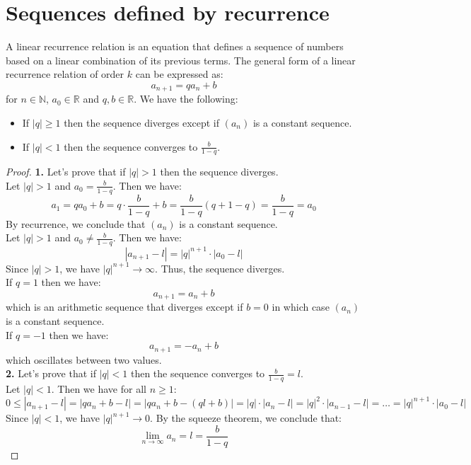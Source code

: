 \section{Sequences defined by recurrence}
\begin{definition}
    A linear recurrence relation is an equation that defines a sequence of numbers based on a linear combination of its previous terms. The general form of a linear recurrence relation of order \( k \) can be expressed as:
    \[
        a_{n + 1} = q a_n + b
    \]
    for \( n \in \mathbb{N} \), \( a_0 \in \mathbb{R} \) and \( q, b \in \mathbb{R} \). We have the following:
    \begin{itemize}[itemsep=1pt,label=$\circ$]
        \item If $|q| \geq 1$ then the sequence diverges except if $(a_n)$ is a constant sequence.
        \item If $|q| < 1$ then the sequence converges to $\frac{b}{1 - q}$.
    \end{itemize}
\end{definition}
\begin{proof}
    \textbf{1.} Let's prove that if $|q| > 1$ then the sequence diverges. \\
    Let $|q| > 1$ and $a_0 = \frac{b}{1 - q}$. Then we have:
    \[ a_1 = q a_0 + b = q \cdot \frac{b}{1 - q} + b = \frac{b}{1 - q} (q + 1 - q) = \frac{b}{1 - q} = a_0 \]
    By recurrence, we conclude that $(a_n)$ is a constant sequence. \\
    Let $|q| > 1$ and $a_0 \neq \frac{b}{1 - q}$. Then we have:
    \[
        |a_{n + 1} - l| = |q|^{n + 1} \cdot |a_0 - l|
    \]
    Since $|q| > 1$, we have $|q|^{n + 1} \to \infty$. Thus, the sequence diverges. \\
    If $q = 1$ then we have:
    \[ a_{n + 1} = a_n + b \]
    which is an arithmetic sequence that diverges except if $b = 0$ in which case $(a_n)$ is a constant sequence. \\
    If $q = -1$ then we have:
    \[ a_{n + 1} = -a_n + b \]
    which oscillates between two values. \\
    \textbf{2.} Let's prove that if $|q| < 1$ then the sequence converges to $\frac{b}{1 - q} = l$. \\
    Let $|q| < 1$. Then we have for all $n \geq 1$:
    \[
        0 \leq |a_{n + 1} - l| = |q a_n + b - l| = |q a_n + b - (q l + b)| = |q| \cdot |a_n - l| = |q|^2 \cdot |a_{n - 1} - l| = \ldots = |q|^{n + 1} \cdot |a_0 - l|
    \]
    Since $|q| < 1$, we have $|q|^{n + 1} \to 0$. By the squeeze theorem, we conclude that:
    \[ \lim_{n \to \infty} a_n = l = \frac{b}{1 - q} \]
\end{proof}

